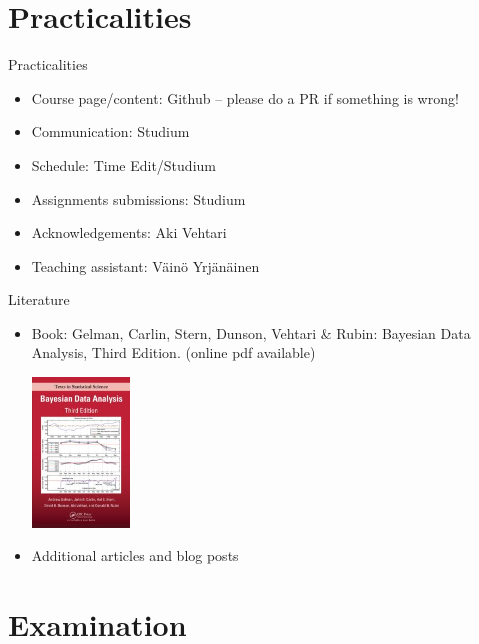 \documentclass[10pt,handout]{beamer}
\begin{document}
\section{Practicalities}
\frame{\sectionpage}

\begin{frame}{Practicalities}

\begin{itemize}
\item Course page/content: Github -- please do a PR if something is wrong!\pause
\item Communication: Studium\pause
\item Schedule: Time Edit/Studium
\item Assignments submissions: Studium\pause
\item Acknowledgements: Aki Vehtari\pause
\item Teaching assistant: Väinö Yrjänäinen
\end{itemize}

\end{frame}

\begin{frame}{Literature}

\begin{itemize}
  \item Book: Gelman, Carlin, Stern, Dunson, Vehtari \& Rubin: Bayesian Data Analysis, Third Edition. {\footnotesize (online pdf available)}
  \begin{center}
    \includegraphics[width=2.6cm]{figs/BDA3.jpg}
  \end{center}
  \item Additional articles and blog posts
\end{itemize}

\end{frame}

\section{Examination}
\frame{\sectionpage}
\end{document}

